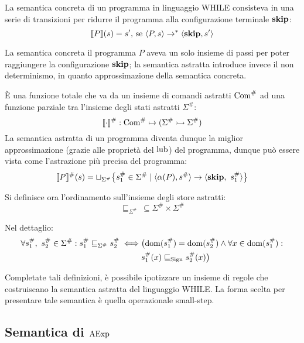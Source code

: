 \begin{definizione}
La semantica concreta di un programma in linguaggio WHILE
consisteva in una serie di transizioni per ridurre il programma
alla configurazione terminale $\mathop{\textup{\textbf{skip}}}$:
\[	
	\llbracket P \rrbracket (s) = s' \text{, se } \langle P, s \rangle \rightarrow^* \langle \mathop{\textup{\textbf{skip}}}, s' \rangle
\]
\end{definizione}
La semantica concreta il programma $P$ aveva un solo insieme di passi
per poter raggiungere la configurazione $\mathop{\textup{\textbf{skip}}}$;
la semantica astratta introduce invece il non determinismo, in quanto
approssimazione della semantica concreta.
\begin{definizione}
È una funzione totale che va da un insieme di comandi astratti $\mathrm{Com}^\#$
ad una funzione parziale tra l'insieme degli stati astratti $\Sigma^\#:$
\[
	\llbracket \cdot \rrbracket^\# : \mathrm{Com}^\# \mapsto (\Sigma^\# \rightarrowtail \Sigma^\#)
\]
La semantica astratta di un programma diventa dunque la miglior
approssimazione (grazie alle proprietà del $\mathop{\mathrm{lub}}\nolimits$) del programma,
dunque può essere vista come l'astrazione più precisa del programma:
\[
	\llbracket P \rrbracket^\# (s) =  \sqcup _{\Sigma^\#} \bigl\{ s^\#_1 \in \Sigma^\# \mid \langle \alpha(P), s^\# \rangle \rightarrow \langle \mathop{\textup{\textbf{skip}}},\ s^\#_1 \rangle \bigr\}
\]
\end{definizione}

\begin{definizione}
Si definisce ora l'ordinamento sull'insieme degli store astratti:
\[
	\sqsubseteq_{\Sigma^\#}\, \subseteq \Sigma^\# \times \Sigma^\#
\]
\end{definizione}
Nel dettaglio:
\begin{align*}
	\forall s_1^\#,\ s_2^\# \in \Sigma^\#
		\mathrel{:} s_1^\# \sqsubseteq_{\Sigma^\#} s_2^\# \iff &\bigl(\mathop{\mathrm{dom}}\nolimits(s_1^\#) = \mathop{\mathrm{dom}}\nolimits(s_2^\#) \land \forall x \in \mathop{\mathrm{dom}}\nolimits(s_1^\#) \mathrel{:} \\
	& s_1^\#(x) \sqsubseteq_{\mathrm{Sign}} s_2^\#(x) \bigr)
\end{align*}

Completate tali definizioni, è possibile ipotizzare un insieme di regole
che costruiscano la semantica astratta del linguaggio WHILE. La forma
scelta per presentare tale semantica è quella operazionale small-step.

\subsection{Semantica di $\mathrm{AExp}$}

